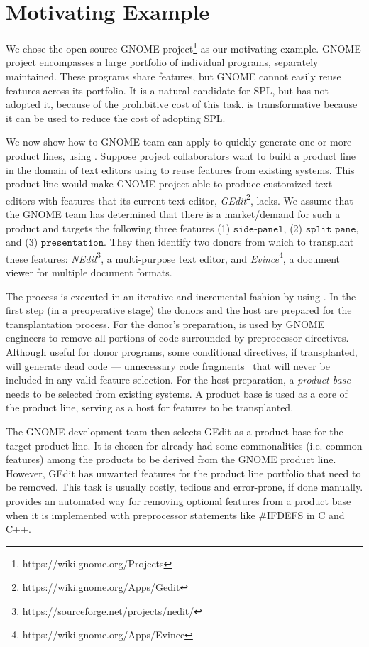 \section{Motivating Example} \label{sec:motivating_example}


We chose the open-source GNOME project\footnote{https://wiki.gnome.org/Projects} as our motivating example. GNOME  project encompasses a large portfolio of individual programs, separately maintained. These programs share features, but GNOME cannot easily reuse features across its portfolio. It is a natural candidate for SPL, but has not adopted it, because of the prohibitive cost of this task.  \FOUNDRY is transformative because it can be used to reduce the cost of adopting SPL.

We now show how to GNOME team can apply \FOUNDRY to quickly generate one or more product lines, using \autoscalpel. Suppose project collaborators want to build a product line in the domain of text editors using \FOUNDRY to reuse features from existing systems. This product line would make GNOME project able to produce customized text editors with features that its current text editor, \emph{GEdit}\footnote{https://wiki.gnome.org/Apps/Gedit}, lacks. We assume that the GNOME team has determined that there is a market/demand for such a product and targets the following three features (1) $\texttt{side-panel}$, (2) $\texttt{split pane}$, and (3) $\texttt{presentation}$. They then identify two donors from which to transplant these features:  \emph{NEdit}\footnote{https://sourceforge.net/projects/nedit/}, a multi-purpose text editor, and \emph{Evince}\footnote{https://wiki.gnome.org/Apps/Evince}, a document viewer for multiple document formats. 
 
The process is executed in an iterative and incremental fashion by using \autoscalpel. In the first step (in a preoperative stage) the donors and the host are prepared for the transplantation process. For the donor's preparation, \autoscalpel is used by GNOME engineers to remove all portions of code surrounded by preprocessor directives. Although useful for donor programs, some conditional directives, if transplanted, will generate dead code — unnecessary code fragments~\cite{Tartler2011} that will never be included in any valid feature selection. For the host preparation, a \emph{product base} needs to be selected from existing systems. A  product base is used as a core of the product line, serving as a host for features to be transplanted. 

The GNOME development team then selects GEdit as a product base for the target product line. It is chosen for already had some commonalities (i.e. common features) among the products to be derived from the GNOME product line. However, GEdit has unwanted features for the product line portfolio that need to be removed. This task is usually costly, tedious and error-prone, if done manually. \autoscalpel provides an automated way for removing optional features from a product base when it is implemented with preprocessor statements like \#IFDEFS in C and C++. 

